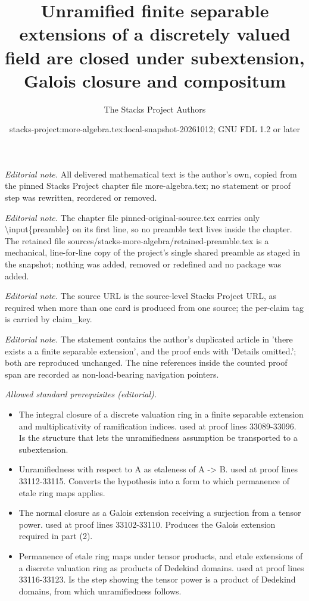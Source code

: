 \documentclass[10pt,a4paper]{amsart}
\title{Unramified finite separable extensions of a discretely valued field are closed under subextension, Galois closure and compositum}
\author{The Stacks Project Authors}
\date{stacks-project:more-algebra.tex:local-snapshot-20261012; GNU FDL 1.2 or later}
\theoremstyle{plain}
\theoremstyle{definition}
\theoremstyle{remark}
\numberwithin{equation}{subsection}
\begin{document}
\maketitle
\setcounter{subsection}{1}
\noindent\textit{Editorial note.} All delivered mathematical text is the author's own, copied from the pinned Stacks Project chapter file more-algebra.tex; no statement or proof step was rewritten, reordered or removed.\par\medskip
\noindent\textit{Editorial note.} The chapter file pinned-original-source.tex carries only \textbackslash{}input\{preamble\} on its first line, so no preamble text lives inside the chapter. The retained file sources/stacks-more-algebra/retained-preamble.tex is a mechanical, line-for-line copy of the project's single shared preamble as staged in the snapshot; nothing was added, removed or redefined and no package was added.\par\medskip
\noindent\textit{Editorial note.} The source URL is the source-level Stacks Project URL, as required when more than one card is produced from one source; the per-claim tag is carried by claim\_key.\par\medskip
\noindent\textit{Editorial note.} The statement contains the author's duplicated article in 'there exists a a finite separable extension', and the proof ends with 'Details omitted.'; both are reproduced unchanged. The nine references inside the counted proof span are recorded as non-load-bearing navigation pointers.\par\medskip
\noindent\textit{Allowed standard prerequisites (editorial).}\begin{itemize}
\item The integral closure of a discrete valuation ring in a finite separable extension and multiplicativity of ramification indices. used at proof lines 33089-33096. Is the structure that lets the unramifiedness assumption be transported to a subextension.
\item Unramifiedness with respect to A as etaleness of A -> B. used at proof lines 33112-33115. Converts the hypothesis into a form to which permanence of etale ring maps applies.
\item The normal closure as a Galois extension receiving a surjection from a tensor power. used at proof lines 33102-33110. Produces the Galois extension required in part (2).
\item Permanence of etale ring maps under tensor products, and etale extensions of a discrete valuation ring as products of Dedekind domains. used at proof lines 33116-33123. Is the step showing the tensor power is a product of Dedekind domains, from which unramifiedness follows.
\end{itemize}\medskip
\end{document}
